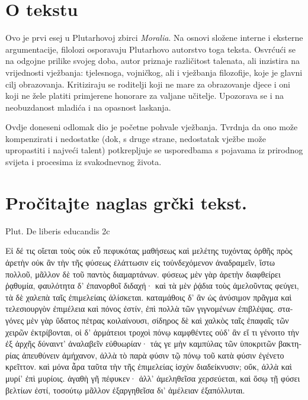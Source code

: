 


\section*{O tekstu}

Ovo je prvi esej u Plutarhovoj zbirci \textit{Moralia}. Na osnovi složene interne i eksterne argumentacije, filolozi osporavaju Plutarhovo autorstvo toga teksta. Osvrćući se na odgojne prilike svojeg doba, autor priznaje različitost talenata, ali inzistira na vrijednosti vježbanja: tjelesnoga, vojničkog, ali i vježbanja filozofije, koje je glavni cilj obrazovanja. Kritiziraju se roditelji koji ne mare za obrazovanje djece i oni koji ne žele platiti primjerene honorare za valjane učitelje. Upozorava se i na neobuzdanost mladića i na opasnost laskanja.

Ovdje doneseni odlomak dio je početne pohvale vježbanja. Tvrdnja da ono može kompenzirati i nedostatke (dok, s druge strane, nedostatak vježbe može upropastiti i najveći talent) potkrepljuje se usporedbama s pojavama iz prirodnog svijeta i procesima iz svakodnevnog života.


\section*{Pročitajte naglas grčki tekst.}
Plut. De liberis educandis 2c

\medskip

{\large
\begin{greek}
\noindent Εἰ δέ τις οἴεται τοὺς οὐκ εὖ πεφυκότας μαθήσεως καὶ μελέτης τυχόντας ὀρθῆς πρὸς ἀρετὴν οὐκ ἂν τὴν τῆς φύσεως ἐλάττωσιν εἰς τοὐνδεχόμενον ἀναδραμεῖν, ἴστω πολλοῦ, μᾶλλον δὲ τοῦ παντὸς διαμαρτάνων. φύσεως μὲν γὰρ ἀρετὴν διαφθείρει ῥᾳθυμία, φαυλότητα δ' ἐπανορθοῖ διδαχή· καὶ τὰ μὲν ῥᾴδια τοὺς ἀμελοῦντας φεύγει, τὰ δὲ χαλεπὰ ταῖς ἐπιμελείαις ἁλίσκεται. καταμάθοις δ' ἂν ὡς ἀνύσιμον πρᾶγμα καὶ τελεσιουργὸν ἐπιμέλεια καὶ πόνος ἐστίν, ἐπὶ πολλὰ τῶν γιγνομένων ἐπιβλέψας. σταγόνες μὲν γὰρ ὕδατος πέτρας κοιλαίνουσι, σίδηρος δὲ καὶ χαλκὸς ταῖς ἐπαφαῖς τῶν χειρῶν ἐκτρίβονται, οἱ δ' ἁρμάτειοι τροχοὶ πόνῳ καμφθέντες οὐδ' ἂν εἴ τι γένοιτο τὴν ἐξ ἀρχῆς δύναιντ' ἀναλαβεῖν εὐθυωρίαν· τάς γε μὴν καμπύλας τῶν ὑποκριτῶν βακτηρίας ἀπευθύνειν ἀμήχανον, ἀλλὰ τὸ παρὰ φύσιν τῷ πόνῳ τοῦ κατὰ φύσιν ἐγένετο κρεῖττον. καὶ μόνα ἆρα ταῦτα τὴν τῆς ἐπιμελείας ἰσχὺν διαδείκνυσιν; οὔκ, ἀλλὰ καὶ μυρί' ἐπὶ μυρίοις. ἀγαθὴ γῆ πέφυκεν· ἀλλ' ἀμεληθεῖσα χερσεύεται, καὶ ὅσῳ τῇ φύσει βελτίων ἐστί, τοσούτῳ μᾶλλον ἐξαργηθεῖσα δι' ἀμέλειαν ἐξαπόλλυται.

\end{greek}
}

